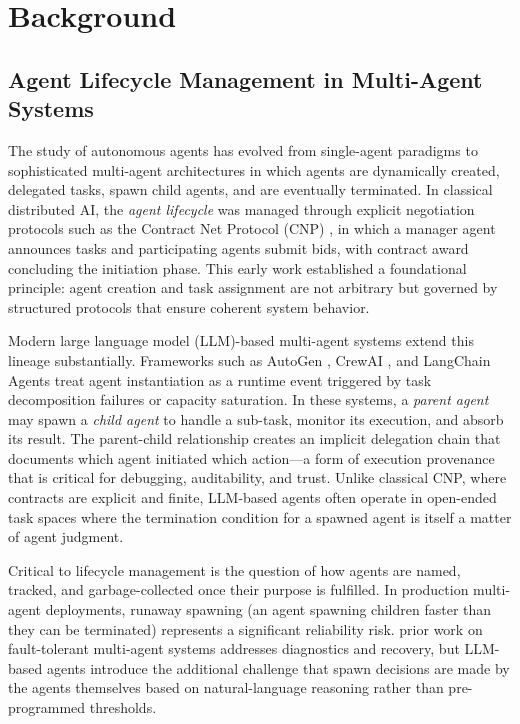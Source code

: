 \section{Background}

\subsection{Agent Lifecycle Management in Multi-Agent Systems}

The study of autonomous agents has evolved from single-agent paradigms to sophisticated multi-agent architectures in which agents are dynamically created, delegated tasks, spawn child agents, and are eventually terminated. In classical distributed AI, the \textit{agent lifecycle} was managed through explicit negotiation protocols such as the Contract Net Protocol (CNP) \cite{Smith1980Contract}, in which a manager agent announces tasks and participating agents submit bids, with contract award concluding the initiation phase. This early work established a foundational principle: agent creation and task assignment are not arbitrary but governed by structured protocols that ensure coherent system behavior.

Modern large language model (LLM)-based multi-agent systems extend this lineage substantially. Frameworks such as AutoGen \cite{Wu2024AutoGen}, CrewAI \cite{CrewAI2024}, and LangChain Agents \cite{LangChain2024} treat agent instantiation as a runtime event triggered by task decomposition failures or capacity saturation. In these systems, a \textit{parent agent} may spawn a \textit{child agent} to handle a sub-task, monitor its execution, and absorb its result. The parent-child relationship creates an implicit delegation chain that documents which agent initiated which action—a form of execution provenance that is critical for debugging, auditability, and trust. Unlike classical CNP, where contracts are explicit and finite, LLM-based agents often operate in open-ended task spaces where the termination condition for a spawned agent is itself a matter of agent judgment.

Critical to lifecycle management is the question of how agents are named, tracked, and garbage-collected once their purpose is fulfilled. In production multi-agent deployments, runaway spawning (an agent spawning children faster than they can be terminated) represents a significant reliability risk. prior work on fault-tolerant multi-agent systems \cite{Horling2004Diagnosing} addresses diagnostics and recovery, but LLM-based agents introduce the additional challenge that spawn decisions are made by the agents themselves based on natural-language reasoning rather than pre-programmed thresholds.

